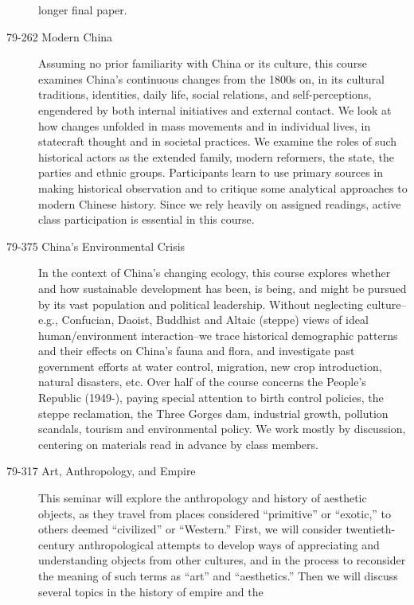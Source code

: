 \begin{description}
        longer final paper.
    \item [79-262 Modern China] Assuming no prior familiarity with China or its
        culture, this course examines China's continuous changes from the 1800s
        on, in its cultural traditions, identities, daily life, social
        relations, and self-perceptions, engendered by both internal initiatives
        and external contact. We look at how changes unfolded in mass movements
        and in individual lives, in statecraft thought and in societal
        practices. We examine the roles of such historical actors as the
        extended family, modern reformers, the state, the parties and ethnic
        groups. Participants learn to use primary sources in making historical
        observation and to critique some analytical approaches to modern Chinese
        history. Since we rely heavily on assigned readings, active class
        participation is essential in this course.
    \item [79-375 China's Environmental Crisis] In the context of China's
        changing ecology, this course explores whether and how sustainable
        development has been, is being, and might be pursued by its vast
        population and political leadership. Without neglecting culture--e.g.,
        Confucian, Daoist, Buddhist and Altaic (steppe) views of ideal
        human/environment interaction--we trace historical demographic patterns
        and their effects on China's fauna and flora, and investigate past
        government efforts at water control, migration, new crop introduction,
        natural disasters, etc. Over half of the course concerns the People's
        Republic (1949-), paying special attention to birth control policies,
        the steppe reclamation, the Three Gorges dam, industrial growth,
        pollution scandals, tourism and environmental policy. We work mostly by
        discussion, centering on materials read in advance by class members.
    \item [79-317 Art, Anthropology, and Empire] This seminar will explore the
        anthropology and history of aesthetic objects, as they travel from
        places considered ``primitive'' or ``exotic,'' to others deemed
        ``civilized'' or ``Western.'' First, we will consider twentieth-century
        anthropological attempts to develop ways of appreciating and
        understanding objects from other cultures, and in the process to
        reconsider the meaning of such terms as ``art'' and ``aesthetics.'' Then
        we will discuss several topics in the history of empire and the

\end{description}
